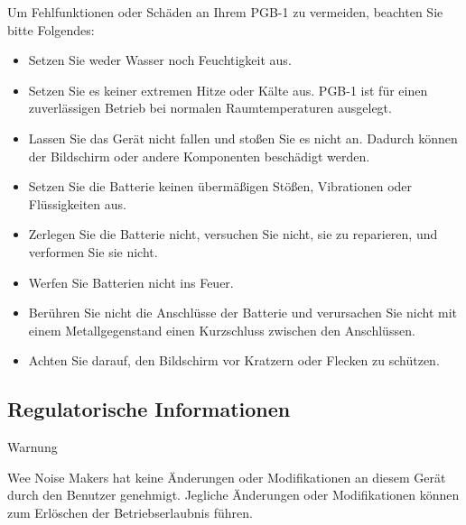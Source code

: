 \documentclass[8pt]{extarticle}
\begin{document}
\begin{multicols*}{3}
Um Fehlfunktionen oder Schäden an Ihrem PGB-1 zu vermeiden, beachten Sie bitte Folgendes:
\begin{itemize}
\item Setzen Sie weder Wasser noch Feuchtigkeit aus.
\item Setzen Sie es keiner extremen Hitze oder Kälte aus. PGB-1 ist für einen zuverlässigen Betrieb bei normalen Raumtemperaturen ausgelegt.
\item Lassen Sie das Gerät nicht fallen und stoßen Sie es nicht an. Dadurch können der Bildschirm oder andere Komponenten beschädigt werden.
\item Setzen Sie die Batterie keinen übermäßigen Stößen, Vibrationen oder Flüssigkeiten aus.
\item Zerlegen Sie die Batterie nicht, versuchen Sie nicht, sie zu reparieren, und verformen Sie sie nicht.
\item Werfen Sie Batterien nicht ins Feuer.
\item Berühren Sie nicht die Anschlüsse der Batterie und verursachen Sie nicht mit einem Metallgegenstand einen Kurzschluss zwischen den Anschlüssen.
\item Achten Sie darauf, den Bildschirm vor Kratzern oder Flecken zu schützen.
\end{itemize}

\subsection{Regulatorische Informationen}

Warnung

Wee Noise Makers hat keine Änderungen oder Modifikationen an diesem Gerät durch den Benutzer genehmigt. Jegliche Änderungen oder Modifikationen können zum Erlöschen der Betriebserlaubnis führen.


\end{multicols*}
\end{document}
